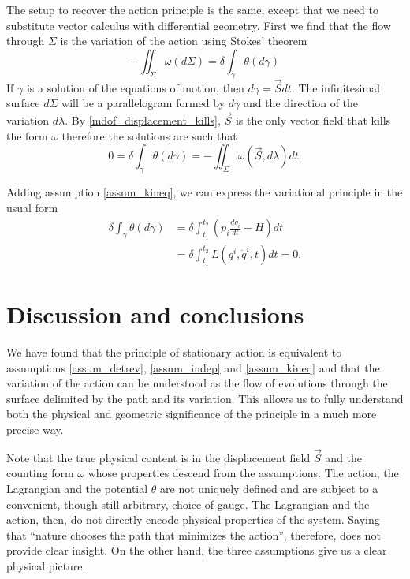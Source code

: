 \documentclass[fleqn,10pt]{wlscirep}
\begin{document}
The setup to recover the action principle is the same, except that we need to substitute vector calculus with differential geometry. First we find that the flow through $\Sigma$ is the variation of the action using Stokes' theorem
\begin{equation}\label{mdof_action}
	- \iint_{\Sigma} \omega(d\Sigma) = \delta \int_{\gamma} \theta(d\gamma) 
\end{equation}
If $\gamma$ is a solution of the equations of motion, then $d\gamma = \vec{S} dt$. The infinitesimal surface $d\Sigma$ will be a parallelogram formed by $d\gamma$ and the direction of the variation $d\lambda$. By \ref{mdof_displacement_kills}, $\vec{S}$ is the only vector field that kills the form $\omega$ therefore the solutions are such that
\begin{equation}\label{mdof_stationary_action}
		0 = \delta \int_{\gamma} \theta(d\gamma) = - \iint_{\Sigma} \omega(\vec{S}, d\lambda) dt. 
\end{equation}

Adding assumption \ref{assum_kineq}, we can express the variational principle in the usual form
\begin{equation}\label{mdof_Lagrangian}
	\begin{aligned}
		\delta \int_{\gamma} \theta(d\gamma) &= \delta \int^{t_2}_{t_1}\left( p_i \frac{dq_i}{dt} - H \right) dt \\
		 &= \delta \int^{t_2}_{t_1}L(q^i, \dot{q}^i, t) dt = 0.
	\end{aligned}
\end{equation}

\section*{Discussion and conclusions}

We have found that the principle of stationary action is equivalent to assumptions \ref{assum_detrev}, \ref{assum_indep} and \ref{assum_kineq} and that the variation of the action can be understood as the flow of evolutions through the surface delimited by the path and its variation. This allows us to fully understand both the physical and geometric significance of the principle in a much more precise way.

Note that the true physical content is in the displacement field $\vec{S}$ and the counting form $\omega$ whose properties descend from the assumptions. The action, the Lagrangian and the potential $\theta$ are not uniquely defined and are subject to a convenient, though still arbitrary, choice of gauge. The Lagrangian and the action, then, do not directly encode physical properties of the system. Saying that ``nature chooses the path that minimizes the action'', therefore, does not provide clear insight. On the other hand, the three assumptions give us a clear physical picture.
\end{document}
